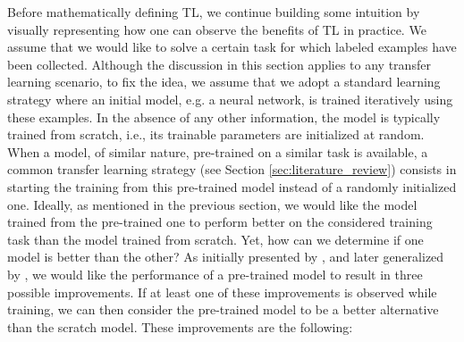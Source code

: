 Before mathematically defining TL, we continue building some intuition by visually representing how one can observe the benefits of TL in practice. We assume that we would like to solve a certain task for which labeled examples have been collected. Although the discussion in this section applies to any transfer learning scenario, to fix the idea, we assume that we adopt a standard learning strategy where an initial model, e.g. a neural network, is trained iteratively using these examples. In the absence of any other information, the model is typically trained from scratch, i.e., its trainable parameters are initialized at random. When a model, of similar nature, pre-trained on a similar task is available, a common transfer learning strategy (see Section \ref{sec:literature_review}) consists in starting the training from this pre-trained model instead of a randomly initialized one. Ideally, as mentioned in the previous section, we would like the model trained from the pre-trained one to perform better on the considered training task than the model trained from scratch. Yet, how can we determine if one model is better than the other?  As initially presented by \citet{langley2006transfer}, and later generalized by \citet{lazaric2012transfer}, we would like the performance of a pre-trained model to result in three possible improvements. If at least one of these improvements is observed while training, we can then consider the pre-trained model to be a better alternative than the scratch model. These improvements are the following:
